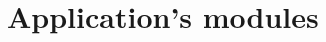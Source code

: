 \chapter{Application's modules}\label{ch:modules}


\pagebreak

\pagebreak

\pagebreak

\pagebreak

\pagebreak

